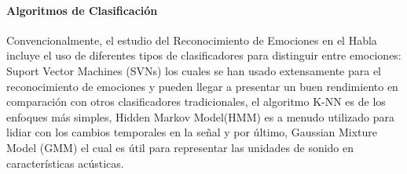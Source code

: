 \documentclass[11pt,a4paper,spanish]{book}
\begin{document}

	
	\paragraph{Algoritmos de Clasificación}
	

	Convencionalmente, el estudio del Reconocimiento de Emociones en el Habla incluye el uso de diferentes tipos de clasificadores para distinguir entre emociones: Suport Vector Machines (SVNs) los cuales se han usado extensamente
	para el reconocimiento de emociones y pueden llegar a presentar un buen rendimiento en comparación con otros clasificadores tradicionales, el algoritmo K-NN es de los enfoques más simples, Hidden Markov Model(HMM) es a menudo utilizado para lidiar con los cambios temporales en la señal y por último, Gaussian Mixture Model (GMM) el cual es útil para representar las unidades de sonido en características acústicas.%
	
\end{document}
